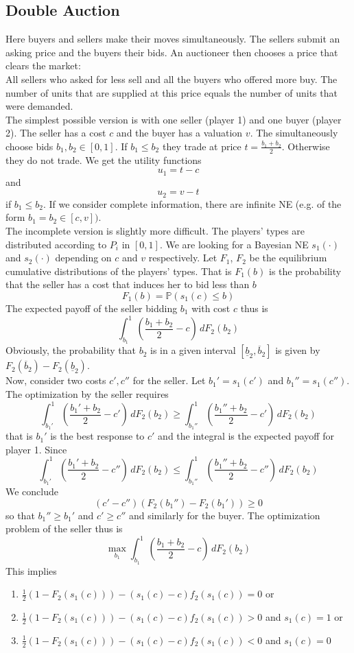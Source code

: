 \documentclass[a4paper, 12pt]{article}
\theoremstyle{plain}
\theoremstyle{definition}
\theoremstyle{lemma}
\theoremstyle{remark}
\theoremstyle{corollary}
\theoremstyle{example}
\begin{document}
	\subsection{Double Auction}
	Here buyers and sellers make their moves simultaneously. The sellers submit an asking price and the buyers their bids. An auctioneer then chooses a price that clears the market:\\
	All sellers who asked for less sell and all the buyers who offered more buy. The number of units that are supplied at this price equals the number of units that were demanded.\\
	The simplest possible version is with one seller (player 1) and one buyer (player 2). The seller has a cost $c$ and the buyer has a valuation $v$. The simultaneously choose bids $b_1,b_2 \in [0,1]$. If $b_1\leq b_2$ they trade at price $t = \frac{b_1+b_2}{2}$. Otherwise they do not trade. We get the utility functions \[u_1 = t-c\] and \[u_2 = v-t\] if $b_1\leq b_2$. If we consider complete information, there are infinite NE (e.g. of the form $b_1=b_2 \in [c,v])$.\\
	The incomplete version is slightly more difficult. The players' types are distributed according to $P_i$ in $[0,1]$. We are looking for a Bayesian NE $s_1(\cdot)$ and $s_2(\cdot)$ depending on $c$ and $v$ respectively. Let $F_1$, $F_2$ be the equilibrium cumulative distributions of the players' types. That is $F_1(b)$ is the probability that the seller has a cost that induces her to bid less than $b$ \[F_1(b) = \mathbb{P}(s_1(c)\leq b)\]
	The expected payoff of the seller bidding $b_1$ with cost $c$ thus is \[\int_{b_1}^{1} \left(\frac{b_1+b_2}{2}-c\right)\, dF_2(b_2)\] Obviously, the probability that $b_2$ is in a given interval $[\underline{b}_2, \overline{b}_2]$ is given by $F_2(\overline{b}_2) - F_2(\underline{b}_2)$.\\
	Now, consider two costs $c',c''$ for the seller. Let $b_1' = s_1(c')$ and $b_1'' = s_1(c'')$. The optimization by the seller requires \[\int_{b_1'}^1 \left(\frac{b_1' + b_2}{2} - c'\right)\,dF_2(b_2) \geq \int_{b_1''}^1\left(\frac{b_1'' + b_2}{2} - c'\right)\,dF_2(b_2)\] that is $b_1'$ is the best response to $c'$ and the integral is the expected payoff for player 1. Since \[\int_{b_1'}^1 \left(\frac{b_1' + b_2}{2} - c''\right)\,dF_2(b_2) \leq \int_{b_1''}^1\left(\frac{b_1'' + b_2}{2} - c''\right)\,dF_2(b_2)\] We conclude \[(c'-c'')(F_2(b_1'') - F_2(b_1')) \geq 0\] so that $b_1'' \geq b_1'$ and $c' \geq c''$ and similarly for the buyer. The optimization problem of the seller thus is \[\max_{b_1} \int_{b_1}^1 \left(\frac{b_1+b_2}{2}-c\right)\, dF_2(b_2)\] This implies \begin{enumerate}
		\item $\frac{1}{2}(1-F_2(s_1(c))) - (s_1(c)-c)f_2(s_1(c)) = 0$ or 
		\item $\frac{1}{2}(1-F_2(s_1(c))) - (s_1(c)-c)f_2(s_1(c)) > 0$ and $s_1(c) = 1$ or 
		\item $\frac{1}{2}(1-F_2(s_1(c))) - (s_1(c)-c)f_2(s_1(c)) < 0$ and $s_1(c) = 0$
	\end{enumerate}
\end{document}
